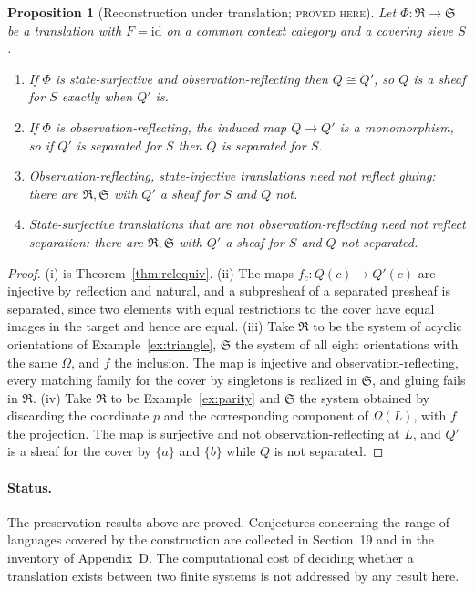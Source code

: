\documentclass[11pt]{article}
\newtheorem{proposition}[theorem]{Proposition}
\theoremstyle{definition}
\theoremstyle{remark}
\newcommand{\stN}{\textsc{proved here}}
\newcommand{\fR}{\mathfrak R}
\newcommand{\fS}{\mathfrak S}
\newcommand{\id}{\mathrm{id}}
\begin{document}
\begin{proposition}[Reconstruction under translation; \stN]\label{prop:reconstruction}
Let $\Phi:\fR\to\fS$ be a translation with $F=\id$ on a common context category and a covering sieve $S$.
\begin{enumerate}[label=(\roman*)]
\item If $\Phi$ is state-surjective and observation-reflecting then $Q\cong Q'$, so $Q$ is a sheaf for $S$ exactly when $Q'$ is.
\item If $\Phi$ is observation-reflecting, the induced map $Q\to Q'$ is a monomorphism, so if $Q'$ is separated for $S$ then $Q$ is separated for $S$.
\item Observation-reflecting, state-injective translations need not reflect gluing: there are $\fR,\fS$ with $Q'$ a sheaf for $S$ and $Q$ not.
\item State-surjective translations that are not observation-reflecting need not reflect separation: there are $\fR,\fS$ with $Q'$ a sheaf for $S$ and $Q$ not separated.
\end{enumerate}
\end{proposition}
\begin{proof}
(i) is Theorem~\ref{thm:relequiv}. (ii) The maps $f_c:Q(c)\to Q'(c)$ are injective by reflection and natural, and a subpresheaf of a separated presheaf is separated, since two elements with equal restrictions to the cover have equal images in the target and hence are equal. (iii) Take $\fR$ to be the system of acyclic orientations of Example~\ref{ex:triangle}, $\fS$ the system of all eight orientations with the same $\Omega$, and $f$ the inclusion. The map is injective and observation-reflecting, every matching family for the cover by singletons is realized in $\fS$, and gluing fails in $\fR$. (iv) Take $\fR$ to be Example~\ref{ex:parity} and $\fS$ the system obtained by discarding the coordinate $p$ and the corresponding component of $\Omega(L)$, with $f$ the projection. The map is surjective and not observation-reflecting at $L$, and $Q'$ is a sheaf for the cover by $\{a\}$ and $\{b\}$ while $Q$ is not separated.
\end{proof}

\paragraph{Status.} The preservation results above are proved. Conjectures concerning the range of languages covered by the construction are collected in Section~19 and in the inventory of Appendix~D. The computational cost of deciding whether a translation exists between two finite systems is not addressed by any result here.
\end{document}
